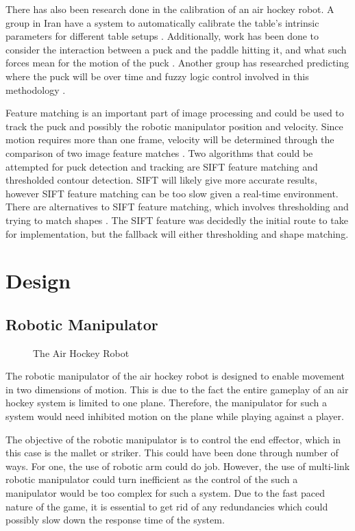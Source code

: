 \documentclass[letterpaper, 12 pt, conference]{ieeeconf}
\begin{document}
There has also been research done in the calibration of an air hockey robot. A group in Iran have a system to automatically calibrate the table’s intrinsic parameters for different table setups \cite{alizadeh}.  Additionally, work has been done to consider the interaction between a puck and the paddle hitting it, and what such forces mean for the motion of the puck \cite{ghazvini} \cite{iguchi}. Another group has researched predicting where the puck will be over time and fuzzy logic control involved in this methodology \cite{wang}.

Feature matching is an important part of image processing and could be used to track the puck and possibly the robotic manipulator position and velocity. Since motion requires more than one frame, velocity will be determined through the comparison of two image feature matches \cite{rahman}. Two algorithms that could be attempted for puck detection and tracking are SIFT feature matching and thresholded contour detection. SIFT will likely give more accurate results, however SIFT feature matching can be too slow given a real-time environment. There are alternatives to SIFT feature matching, which involves thresholding and trying to match shapes \cite{wang} \cite{marra} \cite{bishop}. The SIFT feature was decidedly the initial route to take for implementation, but the fallback will either thresholding and shape matching.

\section{Design}
\label{design}
\subsection{Robotic Manipulator}
\label{design-roboticmanipulator}

\begin{figure}[!h]
\centering
{}
\caption{The Air Hockey Robot}
\end{figure}

The robotic manipulator of the air hockey robot is designed to enable movement in two dimensions of motion. This is due to the fact the entire gameplay of an air hockey system is limited to one plane. Therefore, the manipulator for such a system would need inhibited motion on the plane while playing against a player.

The objective of the robotic manipulator is to control the end effector, which in this case is the mallet or striker. This could have been done through number of ways. For one, the use of robotic arm could do job. However, the use of multi-link robotic manipulator could turn inefficient as the control of the such a manipulator would be too complex for such a system. Due to the fast paced nature of the game, it is essential to get rid of any redundancies which could possibly slow down the response time of the system.
\end{document}
